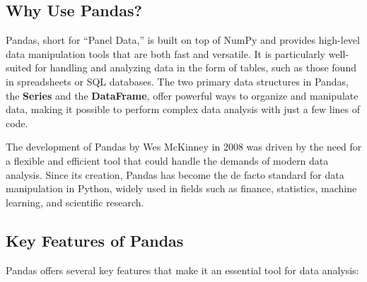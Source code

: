 \documentclass[
  letterpaper,
  DIV=11,
  numbers=noendperiod]{scrreprt}
\begin{document}
\hypertarget{why-use-pandas}{%
\subsection{Why Use Pandas?}\label{why-use-pandas}}

Pandas, short for ``Panel Data,'' is built on top of NumPy and provides
high-level data manipulation tools that are both fast and versatile. It
is particularly well-suited for handling and analyzing data in the form
of tables, such as those found in spreadsheets or SQL databases. The two
primary data structures in Pandas, the \textbf{Series} and the
\textbf{DataFrame}, offer powerful ways to organize and manipulate data,
making it possible to perform complex data analysis with just a few
lines of code.

The development of Pandas by Wes McKinney in 2008 was driven by the need
for a flexible and efficient tool that could handle the demands of
modern data analysis. Since its creation, Pandas has become the de facto
standard for data manipulation in Python, widely used in fields such as
finance, statistics, machine learning, and scientific research.

\hypertarget{key-features-of-pandas}{%
\subsection{Key Features of Pandas}\label{key-features-of-pandas}}

Pandas offers several key features that make it an essential tool for
data analysis:
\end{document}
